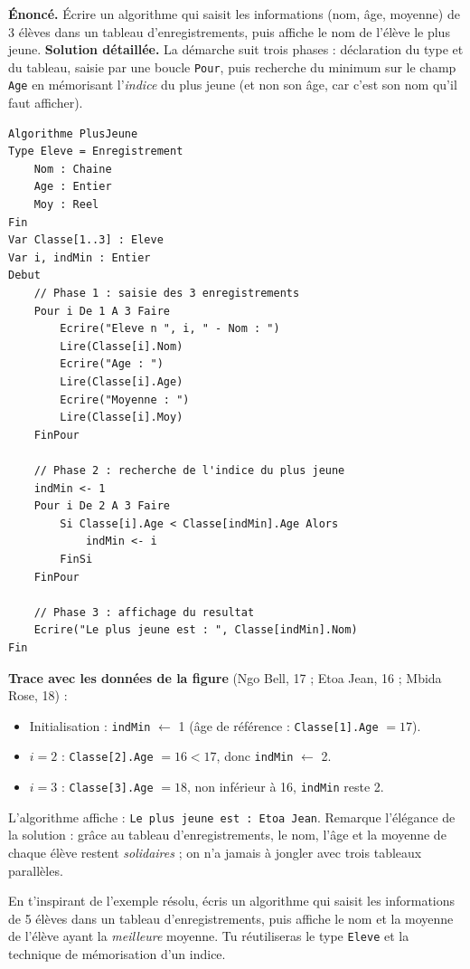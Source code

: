 \documentclass[11pt]{article}
\begin{document}
\begin{exoresolu}
\textbf{Énoncé.} Écrire un algorithme qui saisit les informations (nom, âge, moyenne) de 3 élèves dans un tableau d'enregistrements, puis affiche le nom de l'élève le plus jeune.
\tcblower
\textbf{Solution détaillée.} La démarche suit trois phases : déclaration du type et du tableau, saisie par une boucle \texttt{Pour}, puis recherche du minimum sur le champ \texttt{Age} en mémorisant l'\emph{indice} du plus jeune (et non son âge, car c'est son nom qu'il faut afficher).

\begin{lstlisting}
Algorithme PlusJeune
Type Eleve = Enregistrement
    Nom : Chaine
    Age : Entier
    Moy : Reel
Fin
Var Classe[1..3] : Eleve
Var i, indMin : Entier
Debut
    // Phase 1 : saisie des 3 enregistrements
    Pour i De 1 A 3 Faire
        Ecrire("Eleve n ", i, " - Nom : ")
        Lire(Classe[i].Nom)
        Ecrire("Age : ")
        Lire(Classe[i].Age)
        Ecrire("Moyenne : ")
        Lire(Classe[i].Moy)
    FinPour

    // Phase 2 : recherche de l'indice du plus jeune
    indMin <- 1
    Pour i De 2 A 3 Faire
        Si Classe[i].Age < Classe[indMin].Age Alors
            indMin <- i
        FinSi
    FinPour

    // Phase 3 : affichage du resultat
    Ecrire("Le plus jeune est : ", Classe[indMin].Nom)
Fin
\end{lstlisting}

\textbf{Trace avec les données de la figure} (Ngo Bell, 17 ; Etoa Jean, 16 ; Mbida Rose, 18) :
\begin{itemize}
\item Initialisation : \texttt{indMin} $\leftarrow$ 1 (âge de référence : \texttt{Classe[1].Age} $= 17$).
\item $i = 2$ : \texttt{Classe[2].Age} $= 16 < 17$, donc \texttt{indMin} $\leftarrow$ 2.
\item $i = 3$ : \texttt{Classe[3].Age} $= 18$, non inférieur à 16, \texttt{indMin} reste 2.
\end{itemize}
L'algorithme affiche : \texttt{Le plus jeune est : Etoa Jean}. Remarque l'élégance de la solution : grâce au tableau d'enregistrements, le nom, l'âge et la moyenne de chaque élève restent \emph{solidaires} ; on n'a jamais à jongler avec trois tableaux parallèles.
\end{exoresolu}

\begin{exercice}
En t'inspirant de l'exemple résolu, écris un algorithme qui saisit les informations de 5 élèves dans un tableau d'enregistrements, puis affiche le nom et la moyenne de l'élève ayant la \emph{meilleure} moyenne. Tu réutiliseras le type \texttt{Eleve} et la technique de mémorisation d'un indice.
\end{exercice}
\end{document}
